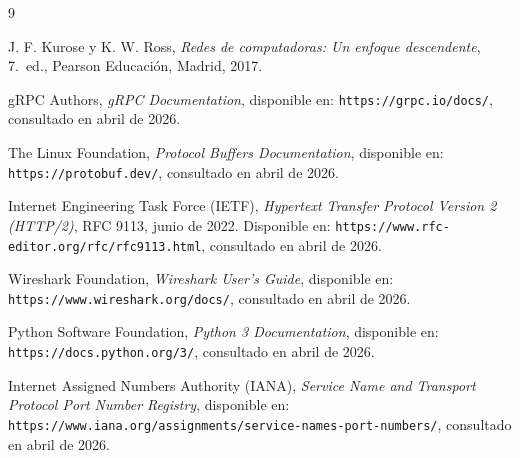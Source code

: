 \documentclass[a4paper,12pt]{article}
\begin{document}
\begin{thebibliography}{9}

J. F. Kurose y K. W. Ross,
\textit{Redes de computadoras: Un enfoque descendente},
7.\ ed.,
Pearson Educación, Madrid, 2017.

gRPC Authors,
\textit{gRPC Documentation},
disponible en: \texttt{https://grpc.io/docs/},
consultado en abril de 2026.

The Linux Foundation,
\textit{Protocol Buffers Documentation},
disponible en: \texttt{https://protobuf.dev/},
consultado en abril de 2026.

Internet Engineering Task Force (IETF),
\textit{Hypertext Transfer Protocol Version 2 (HTTP/2)},
RFC 9113, junio de 2022.
Disponible en: \texttt{https://www.rfc-editor.org/rfc/rfc9113.html},
consultado en abril de 2026. 

Wireshark Foundation,
\textit{Wireshark User's Guide},
disponible en: \texttt{https://www.wireshark.org/docs/},
consultado en abril de 2026.

Python Software Foundation,
\textit{Python 3 Documentation},
disponible en: \texttt{https://docs.python.org/3/},
consultado en abril de 2026.

Internet Assigned Numbers Authority (IANA),
\textit{Service Name and Transport Protocol Port Number Registry},
disponible en: \texttt{https://www.iana.org/assignments/service-names-port-numbers/},
consultado en abril de 2026.

\end{thebibliography}
\end{document}
